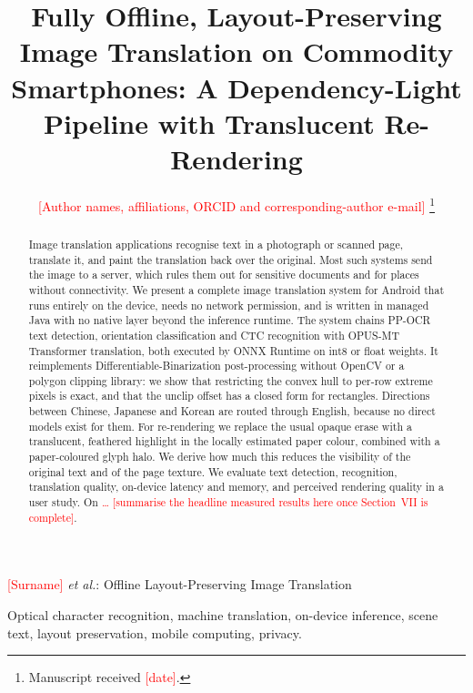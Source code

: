\documentclass[journal]{IEEEtran}
\newcommand{\tbd}[1][--]{\textcolor{red}{#1}}
\newcommand{\note}[1]{\textcolor{red}{[#1]}}
\newcommand{\tbd}[1][--]{#1}
\newcommand{\note}[1]{}
\theoremstyle{definition}
\begin{document}
\title{Fully Offline, Layout-Preserving Image Translation on Commodity Smartphones:
A Dependency-Light Pipeline with Translucent Re-Rendering}

\author{%
  \note{Author names, affiliations, ORCID and corresponding-author e-mail}%
  \thanks{Manuscript received \note{date}.}%
}

\markboth{\note{Journal name}, Vol.~XX, No.~X, \note{Month}~2026}%
{\note{Surname} \MakeLowercase{\textit{et al.}}: Offline Layout-Preserving Image Translation}

\maketitle

\begin{abstract}
Image translation applications recognise text in a photograph or scanned page,
translate it, and paint the translation back over the original. Most such
systems send the image to a server, which rules them out for sensitive
documents and for places without connectivity. We present a complete image
translation system for Android that runs entirely on the device, needs no
network permission, and is written in managed Java with no native layer beyond
the inference runtime. The system chains PP-OCR text detection, orientation
classification and CTC recognition with OPUS-MT Transformer translation, both
executed by ONNX Runtime on int8 or float weights. It reimplements
Differentiable-Binarization post-processing without OpenCV or a polygon
clipping library: we show that restricting the convex hull to per-row extreme
pixels is exact, and that the unclip offset has a closed form for rectangles.
Directions between Chinese, Japanese and Korean are routed through English,
because no direct models exist for them. For re-rendering we replace the usual
opaque erase with a translucent, feathered highlight in the locally estimated
paper colour, combined with a paper-coloured glyph halo. We derive how much
this reduces the visibility of the original text and of the page texture. We
evaluate text detection, recognition, translation quality, on-device latency
and memory, and perceived rendering quality in a user study. On
\tbd[\ldots]{} \note{summarise the headline measured results here once
Section~VII is complete}.
\end{abstract}

\begin{IEEEkeywords}
Optical character recognition, machine translation, on-device inference,
scene text, layout preservation, mobile computing, privacy.
\end{IEEEkeywords}
\end{document}
